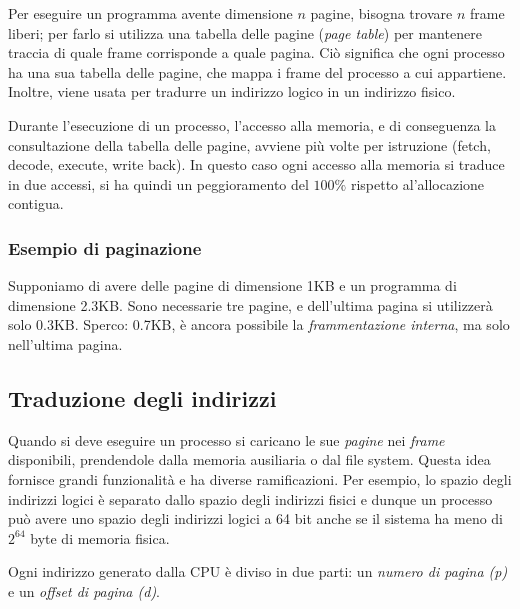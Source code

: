\documentclass[a4paper,12pt, twoside]{report}
\begin{document}
Per eseguire un programma avente dimensione $n$ pagine, bisogna trovare $n$
frame liberi; per farlo si utilizza una tabella delle pagine (\emph{page table}) per mantenere traccia di quale frame corrisponde a quale pagina. 
Ci\`o significa che ogni processo ha una sua tabella delle pagine, che mappa
i frame del processo a cui appartiene. Inoltre, viene usata per tradurre 
un indirizzo logico in un indirizzo fisico. 

Durante l'esecuzione di un processo, l'accesso alla memoria, e di conseguenza la consultazione della tabella delle pagine, avviene pi\`u volte per istruzione (fetch, decode, execute, write back). In questo caso ogni
accesso alla memoria si traduce in due accessi, si ha quindi un peggioramento del $100\%$ rispetto al'allocazione 
contigua.

\subsubsection{Esempio di paginazione}

Supponiamo di avere delle pagine di dimensione 1KB e un programma di dimensione 2.3KB. Sono necessarie tre pagine,
e dell'ultima pagina si utilizzer\`a solo 0.3KB. Sperco: 0.7KB, \`e ancora possibile la \emph{frammentazione interna}, ma 
solo nell'ultima pagina.

\subsection{Traduzione degli indirizzi}

Quando si deve eseguire un processo si caricano le sue \emph{pagine} nei 
\emph{frame} disponibili, prendendole dalla memoria ausiliaria o dal file 
system. Questa idea fornisce grandi funzionalit\`a e ha diverse 
ramificazioni. Per esempio, lo spazio degli indirizzi logici \`e separato 
dallo spazio degli indirizzi fisici e dunque un processo pu\`o avere uno 
spazio degli indirizzi logici a 64 bit anche se il sistema ha meno di 
$2^{64}$ byte di memoria fisica. 

Ogni indirizzo generato dalla CPU \`e diviso in due parti: un \emph{numero 
di pagina (p)}  e un \emph{offset di pagina (d)}.
\begin{center}
\end{center}
\end{document}
